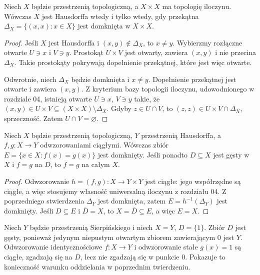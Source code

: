 \begin{stwierdzenie}
\label{prop:topog-przekatna-hausdorff}
Niech $X$ będzie przestrzenią topologiczną, a $X\times X$
ma topologię iloczynu. Wówczas $X$ jest Hausdorffa wtedy i tylko
wtedy, gdy przekątna $\Delta_X=\{(x,x):x\in X\}$ jest domknięta
w $X\times X$.
\end{stwierdzenie}
\begin{proof}
Jeśli $X$ jest Hausdorffa i $(x,y)\notin\Delta_X$, to $x\ne y$.
Wybierzmy rozłączne otwarte $U\ni x$ i $V\ni y$.
Prostokąt $U\times V$ jest otwarty, zawiera $(x,y)$ i nie przecina
$\Delta_X$. Takie prostokąty pokrywają dopełnienie przekątnej,
które jest więc otwarte.

Odwrotnie, niech $\Delta_X$ będzie domknięta i $x\ne y$.
Dopełnienie przekątnej jest otwarte i zawiera $(x,y)$.
Z kryterium bazy topologii iloczynu, udowodnionego
w rozdziale 04, istnieją otwarte $U\ni x$,
$V\ni y$ takie, że $(x,y)\in U\times V\subseteq
(X\times X)\setminus\Delta_X$. Gdyby $z\in U\cap V$,
to $(z,z)\in U\times V\cap\Delta_X$, sprzeczność.
Zatem $U\cap V=\varnothing$.
\end{proof}

\begin{twierdzenie}
\label{thm:topog-rownosc-na-gestym}
Niech $X$ będzie przestrzenią topologiczną, $Y$ przestrzenią
Hausdorffa, a $f,g\colon X\to Y$ odwzorowaniami ciągłymi.
Wówczas zbiór $E=\{x\in X:f(x)=g(x)\}$ jest domknięty.
Jeśli ponadto $D\subseteq X$ jest gęsty w $X$ i $f=g$ na $D$,
to $f=g$ na całym $X$.
\end{twierdzenie}
\begin{proof}
Odwzorowanie $h=(f,g)\colon X\to Y\times Y$ jest ciągłe:
jego współrzędne są ciągłe, a więc stosujemy własność
uniwersalną iloczynu z rozdziału 04.
Z poprzedniego stwierdzenia $\Delta_Y$ jest domknięta,
zatem $E=h^{-1}(\Delta_Y)$ jest domknięty.
Jeśli $D\subseteq E$ i $\overline D=X$, to
$X=\overline D\subseteq E$, a więc $E=X$.
\end{proof}

\begin{uwaga}
Niech $Y$ będzie przestrzenią Sierpińskiego i niech
$X=Y$, $D=\{1\}$. Zbiór $D$ jest gęsty, ponieważ jedynym
niepustym otwartym zbiorem zawierającym $0$ jest $Y$.
Odwzorowanie identycznościowe $f\colon X\to Y$ i odwzorowanie
stałe $g(x)=1$ są ciągłe, zgadzają się na $D$, lecz nie
zgadzają się w punkcie $0$. Pokazuje to konieczność
warunku oddzielania w poprzednim twierdzeniu.
\end{uwaga}

